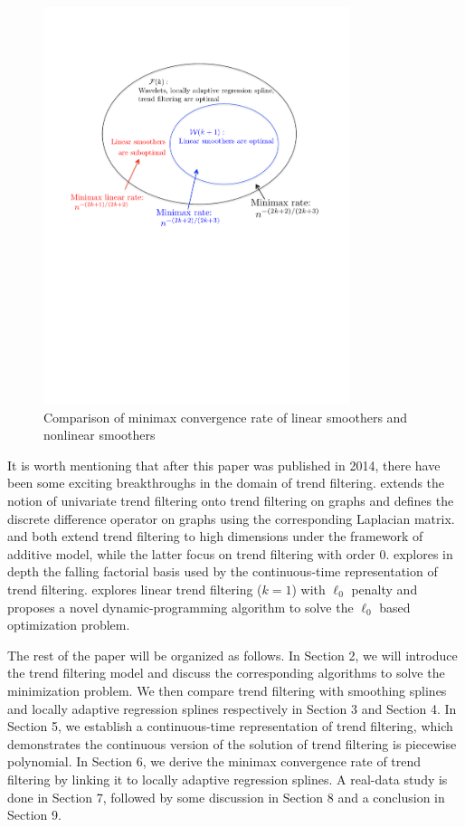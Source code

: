 \documentclass[a4paper]{article}
\begin{document}
\begin{figure}[t!]
\centering
\includegraphics[width = 0.8\textwidth]{Figures/diagram.pdf}
\caption{Comparison of minimax convergence rate of linear smoothers and nonlinear smoothers}
\label{fig:diagram}
\end{figure}
 
It is worth mentioning that after this paper was published in 2014, there have been some exciting breakthroughs in the domain of trend filtering. \cite{wang2016trend} extends the notion of univariate trend filtering onto trend filtering on graphs and defines the discrete difference operator on graphs using the corresponding Laplacian matrix. \cite{sadhanala2017additive} and \cite{petersen2014fused} both extend trend filtering to high dimensions under the framework of additive model, while the latter focus on trend filtering with order $0$. \cite{wang2014falling} explores in depth the falling factorial basis used by the continuous-time representation of trend filtering. \cite{maidstone2017detecting} explores linear trend filtering ($k =1$) with $\ell_0$ penalty and proposes a novel dynamic-programming algorithm to solve the $\ell_0$ based optimization problem. 

The rest of the paper will be organized as follows. In Section 2, we will introduce the trend filtering model and discuss the corresponding algorithms to solve the minimization problem. We then compare trend filtering with smoothing splines and locally adaptive regression splines respectively in Section 3 and Section 4. In Section 5, we establish a continuous-time representation of trend filtering, which demonstrates the continuous version of the solution of trend filtering is piecewise polynomial. In Section 6, we derive the minimax convergence rate of trend filtering by linking it to locally adaptive regression splines. A real-data study is done in Section 7, followed by some discussion in Section 8 and a conclusion in Section 9. 
\end{document}

